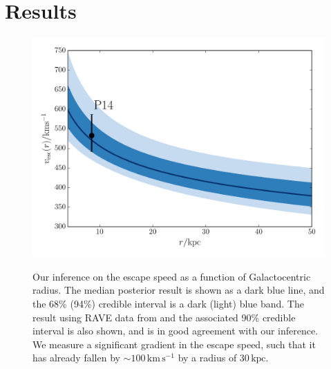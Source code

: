 \documentclass[useAMS,twocolumn,usenatbib]{mn2e}
\def\kpc{{\,\mathrm{kpc}}}
\def\kms{{\,\mathrm{km\,s^{-1}}}}
\begin{document}
\section{Results}

\label{sec:res}

\begin{figure}
\includegraphics[width=\columnwidth]{plots/vesc_posterior}\\
\caption{Our inference on the escape speed as a function of Galactocentric radius. 
The median posterior result is shown as a {} dark blue line, and the 68\% (94\%) credible interval is a dark (light) blue band. 
The result using RAVE data from \citet{Pi14} and the associated 90\% credible interval is also shown, and is in good agreement with our inference. 
We measure a significant gradient in the escape speed, such that it has already fallen by $\sim 100\kms$ by  a radius of $30\kpc$.}
\label{fig:vesc_posterior}
\end{figure}
\end{document}
